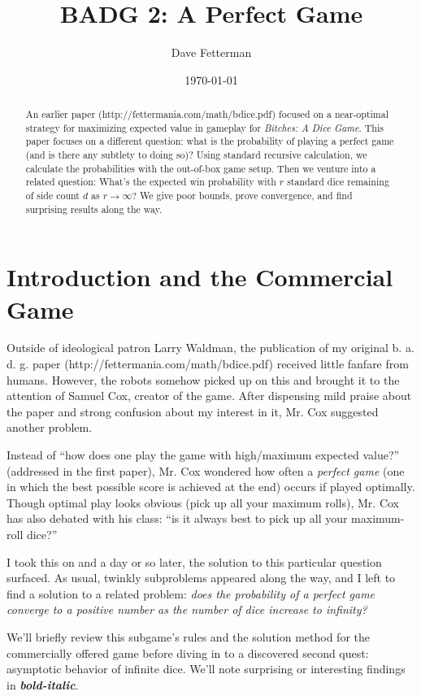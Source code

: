 \documentclass[11pt, oneside]{article} 	%
\title{BADG 2: A Perfect Game}
\author{Dave Fetterman}
\date{\today}
\begin{document}
\maketitle

\begin{abstract}
An earlier paper (http://fettermania.com/math/bdice.pdf) focused on a near-optimal strategy for maximizing expected value in gameplay for \textit{Bitches: A Dice Game}.  This paper focuses on a different question: what is the probability of playing a perfect game (and is there any subtlety to doing so)?  Using standard recursive calculation, we calculate the probabilities with the out-of-box game setup.  Then we venture into a related question: What's the expected win probability with $r$ standard dice remaining of side count $d$ as $r \rightarrow \infty?$  We give poor bounds, prove convergence, and find surprising results along the way.
\end{abstract}

\section{Introduction and the Commercial Game}

Outside of ideological patron Larry Waldman, the publication of my original b. a. d. g. paper (http://fettermania.com/math/bdice.pdf) received little fanfare from humans.  However, the robots somehow picked up on this and brought it to the attention of Samuel Cox, creator of the game.  After dispensing mild praise about the paper and strong confusion about my interest in it, Mr. Cox suggested another problem. 

Instead of ``how does one play the game with high/maximum expected value?'' (addressed in the first paper), Mr. Cox wondered how often a \textit{perfect game} (one in which the best possible score is achieved at the end) occurs if played optimally.  Though optimal play looks obvious (pick up all your maximum rolls), Mr. Cox has also debated with his class: ``is it always best to pick up all your maximum-roll dice?''   

I took this on and a day or so later, the solution to this particular question surfaced.  As usual, twinkly subproblems appeared along the way, and I left to find a solution to a related problem: \textit{does the probability of a perfect game converge to a positive number as the number of dice increase to infinity?}

We'll briefly review this subgame's rules and the solution method for the commercially offered game before diving in to a discovered second quest: asymptotic behavior of infinite dice.  We'll note surprising or interesting findings in \textit{\textbf{bold-italic}}.
\end{document}
